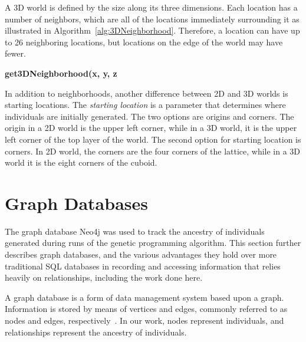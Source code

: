\documentclass[12pt]{article}
\begin{document}
A 3D world is defined by the size along its three dimensions. Each location has a number of neighbors, which are all of the locations immediately surrounding it as illustrated in Algorithm~\ref{alg:3DNeighborhood}. Therefore, a location can have up to 26 neighboring locations, but locations on the edge of the world may have fewer.

\begin{algorithm}[tb]
{\bf get3DNeighborhood(x, y, z}
\caption{Pseudocode finding the neighborhood list in a 3D world. x, y, and z are the 3D coordinates of the location in the world.}
\label{alg:3DNeighborhood}
\end{algorithm}

In addition to neighborhoods, another difference between 2D and 3D worlds is starting locations. The \emph{starting location} is a parameter that determines where individuals are initially generated. The two options are origins and corners. The origin in a 2D world is the upper left corner, while in a 3D world, it is the upper left corner of the top layer of the world. The second option for starting location is corners. In  2D world, the corners are the four corners of the lattice, while in a 3D world it is the eight corners of the cuboid.

\section{Graph Databases}
\label{sec:Graph Databases}

The graph database Neo4j was used to track the ancestry of individuals generated during runs of the genetic programming algorithm. This section further describes graph databases, and the various advantages they hold over more traditional SQL databases in recording and accessing information that relies heavily on relationships, including the work done here.

A graph database is a form of data management system based upon a graph. Information is stored by means of vertices and edges, commonly referred to as nodes and edges, respectively~\cite{GraphDatabases:2013}. In our work, nodes represent individuals, and relationships represent the ancestry of individuals.
\end{document}
